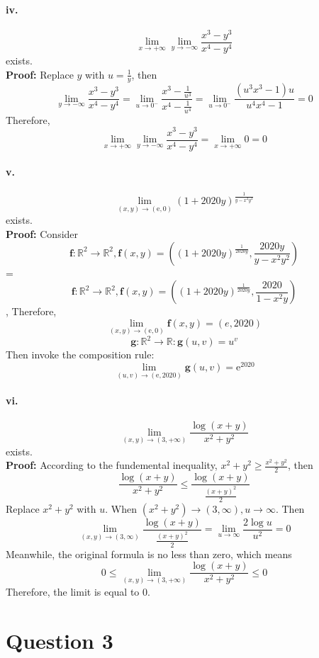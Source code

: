 \documentclass[11pt, a4paper]{article}
\begin{document}
\paragraph{iv.}

$$\lim_{x \to +\infty}\lim_{y \to -\infty} \frac{x ^ 3 - y ^ 3}{x ^ 4 - y ^ 4}$$ exists. \\
\textbf{Proof:} Replace $y$ with $u = \frac{1}{y}$, then
$$\lim_{y \to -\infty} \frac{x ^ 3 - y ^ 3}{x ^ 4 - y ^ 4} = \lim_{u \to 0 ^ -} \frac{x ^ 3 - \frac{1}{u ^ 3}}{{x ^ 4 - \frac{1}{u ^ 4}}} = \lim_{u \to 0 ^ -} \frac{(u ^ 3 x ^ 3 - 1)u}{u ^ 4 x ^ 4 - 1} = 0$$
Therefore,
$$\lim_{x \to +\infty}\lim_{y \to -\infty} \frac{x ^ 3 - y ^ 3}{x ^ 4 - y ^ 4} = \lim_{x \to +\infty} 0 = 0$$

\paragraph{v.}
$$\lim_{(x, y) \to (\mathrm{e}, 0)}(1 + 2020y)^{\frac{1}{y - x ^ 2 y ^ 2}}$$ exists. \\
\textbf{Proof:} Consider 
$$\bm{f}: \mathbb{R} ^ 2 \to \mathbb{R} ^ 2, \bm{f}(x, y) = ((1 + 2020y) ^ \frac{1}{2020y}, \frac{2020y}{y - x ^ 2 y ^ 2})$$ = 
$$\bm{f}: \mathbb{R} ^ 2 \to \mathbb{R} ^ 2, \bm{f}(x, y) = ((1 + 2020y) ^ \frac{1}{2020y}, \frac{2020}{1 - x ^ 2 y})$$,
Therefore, 
$$\lim_{(x, y) \to (\mathrm{e}, 0)} \bm{f}(x, y) = (e, 2020)$$
$$\bm{g}: \mathbb{R} ^ 2 \to \mathbb{R}: \bm{g}(u, v) = u ^ v$$
Then invoke the composition rule:
$$\lim_{(u, v) \to (\mathrm{e}, 2020)} \bm{g}(u, v) = \mathrm{e} ^ {2020}$$

\paragraph{vi.}
$$\lim_{(x, y) \to (3, +\infty)} \frac{\log(x + y)}{x ^ 2 + y ^ 2}$$ exists. \\
\textbf{Proof:} According to the fundemental inequality, $x ^ 2 + y ^ 2 \geq \frac{x ^ 2 + y ^ 2}{2}$, then
$$\frac{\log(x + y)}{x ^ 2 + y ^ 2} \leq \frac{\log(x + y)}{\frac{(x + y) ^ 2}{2}}$$
Replace $x ^ 2 + y ^ 2$ with $u$. When $(x ^ 2 + y ^ 2) \to (3, \infty), u \to \infty$. Then 
$$\lim_{(x, y) \to (3, \infty)} \frac{\log(x + y)}{\frac{(x + y) ^ 2}{2}} = \lim_{u \to \infty} \frac{2\log u}{u ^ 2} = 0$$
Meanwhile, the original formula is no less than zero, which means
$$0 \leq \lim_{(x, y) \to (3, +\infty)} \frac{\log(x + y)}{x ^ 2 + y ^ 2} \leq 0$$
Therefore, the limit is equal to 0.

\section*{Question 3}
\end{document}

